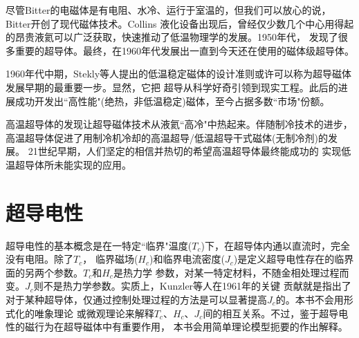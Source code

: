 \begin{table}[htbp]
\end{table}

尽管Bitter的电磁体是有电阻、水冷、运行于室温的，但我们可以放心的说，Bitter开创了现代磁体技术。Collins
液化设备出现后，曾经仅少数几个中心用得起的昂贵液氦可以广泛获取，快速推动了低温物理学的发展。1950年代，
发现了很多重要的超导体。最终，在1960年代发展出一直到今天还在使用的磁体级超导体。

1960年代中期，Stekly等人提出的低温稳定磁体的设计准则或许可以称为超导磁体发展早期的最重要一步。显然，它把
超导从科学好奇引领到现实工程。此后的进展成功开发出``高性能"(绝热，非低温稳定)磁体，至今占据多数``市场"份额。

高温超导体的发现让超导磁体技术从液氦``高冷"中热起来。伴随制冷技术的进步，高温超导体促进了用制冷机冷却的高温超导/低温超导干式磁体(无制冷剂)的发展。
21世纪早期，人们坚定的相信并热切的希望高温超导体最终能成功的
实现低温超导体所未能实现的应用。

\section{超导电性}
超导电性的基本概念是在一特定``临界"温度($T_c$)下，在超导体内通以直流时，完全没有电阻。除了$T_c$，
临界磁场($H_c$)和临界电流密度($J_c$)是定义超导电性存在的临界面的另两个参数。$T_c$和$H_c$是热力学
参数，对某一特定材料，不随金相处理过程而变。$J_c$则不是热力学参数。实质上，Kunzler等人在1961年的关键
贡献就是指出了对于某种超导体，仅通过控制处理过程的方法是可以显著提高$J_c$的。本书不会用形式化的唯象理论
或微观理论来解释$T_c$、$H_c$、$J_c$间的相互关系。不过，鉴于超导电性的磁行为在超导磁体中有重要作用，
本书会用简单理论模型扼要的作出解释。

